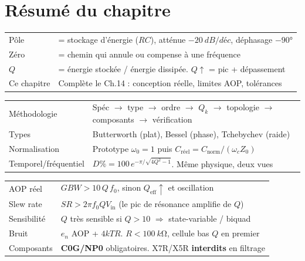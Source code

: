 \documentclass[12pt,a4paper,twoside]{book}
\begin{document}
\section*{Résumé du chapitre}

\begin{bases}[title={\color{white} Résumé --- Les Bases}]
\begin{center}
\renewcommand{\arraystretch}{1.3}
\begin{tabular}{p{3.5cm}p{9.5cm}}
\toprule
Pôle & = stockage d'énergie ($RC$), atténue $-\SI{20}{dB/déc}$, déphasage $-90°$ \\
Zéro & = chemin qui annule ou compense à une fréquence \\
$Q$ & = énergie stockée / énergie dissipée. $Q \uparrow$ = pic + dépassement \\
Ce chapitre & Complète le Ch.14 : conception réelle, limites AOP, tolérances \\
\bottomrule
\end{tabular}
\end{center}
\end{bases}

\begin{approfondissement}[title={\color{white} Résumé --- Approfondissement}]
\begin{center}
\renewcommand{\arraystretch}{1.3}
\begin{tabular}{p{3.5cm}p{9.5cm}}
\toprule
Méthodologie & Spéc $\to$ type $\to$ ordre $\to$ $Q_k$ $\to$ topologie $\to$ composants $\to$ vérification \\
Types & Butterworth (plat), Bessel (phase), Tchebychev (raide) \\
Normalisation & Prototype $\omega_0=1$ puis $C_{\text{réel}} = C_{\text{norm}}/(\omega_c Z_0)$ \\
Temporel/fréquentiel & $D\% = 100\,e^{-\pi/\sqrt{4Q^2-1}}$. Même physique, deux vues \\
\bottomrule
\end{tabular}
\end{center}
\end{approfondissement}

\begin{ingenieur}[title={\color{white} Résumé --- Niveau Ingénieur}]
\begin{center}
\renewcommand{\arraystretch}{1.3}
\begin{tabular}{p{3.5cm}p{9.5cm}}
\toprule
AOP réel & $GBW > 10\,Q\,f_0$, sinon $Q_{\text{eff}} \uparrow$ et oscillation \\
Slew rate & $SR > 2\pi f_0 Q V_{\text{in}}$ (le pic de résonance amplifie de $Q$) \\
Sensibilité & $Q$ très sensible si $Q > 10$ $\Rightarrow$ state-variable / biquad \\
Bruit & $e_n$ AOP + $4kTR$. $R < \SI{100}{k\ohm}$, cellule bas $Q$ en premier \\
Composants & \textbf{C0G/NP0} obligatoires. X7R/X5R \textbf{interdits} en filtrage \\
\bottomrule
\end{tabular}
\end{center}
\end{ingenieur}
\end{document}
